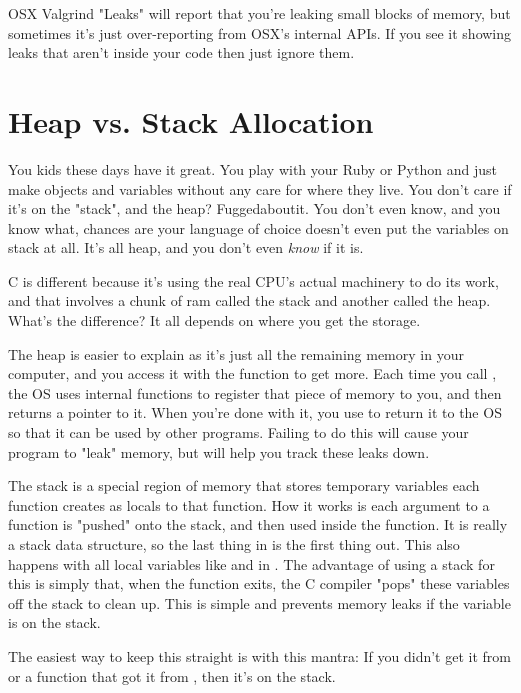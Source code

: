 \begin{aside}{OSX Valgrind "Leaks"}
 will report that you're leaking small blocks of memory,
but sometimes it's just over-reporting from OSX's internal APIs.  If you see it
showing leaks that aren't inside your code then just ignore them.
\end{aside}

\section{Heap vs. Stack Allocation}

You kids these days have it great.  You play with your Ruby or Python and 
just make objects and variables without any care for where they live.  You
don't care if it's on the "stack", and the heap?  Fuggedaboutit.  You don't
even know, and you know what, chances are your language of choice doesn't
even put the variables on stack at all.  It's all heap, and you don't even
\emph{know} if it is.

C is different because it's using the real CPU's actual machinery to do its
work, and that involves a chunk of ram called the stack and another 
called the heap.  What's the difference?  It all depends on where you
get the storage.

The heap is easier to explain as it's just all the remaining memory in
your computer, and you access it with the function  to
get more.  Each time you call , the OS uses internal 
functions to register that piece of memory to you, and then returns
a pointer to it.  When you're done with it, you use  to
return it to the OS so that it can be used by other programs.  Failing
to do this will cause your program to "leak" memory, but 
will help you track these leaks down.

The stack is a special region of memory that stores temporary variables each
function creates as locals to that function.  How it works is each argument to
a function is "pushed" onto the stack, and then used inside the function.  It
is really a stack data structure, so the last thing in is the first thing out.
This also happens with all local variables like  and
 in .  The advantage of using a stack for this is
simply that, when the function exits, the C compiler "pops" these variables off
the stack to clean up.  This is simple and prevents memory leaks if the
variable is on the stack.

The easiest way to keep this straight is with this mantra:  If you
didn't get it from  or a function that got it from ,
then it's on the stack.


